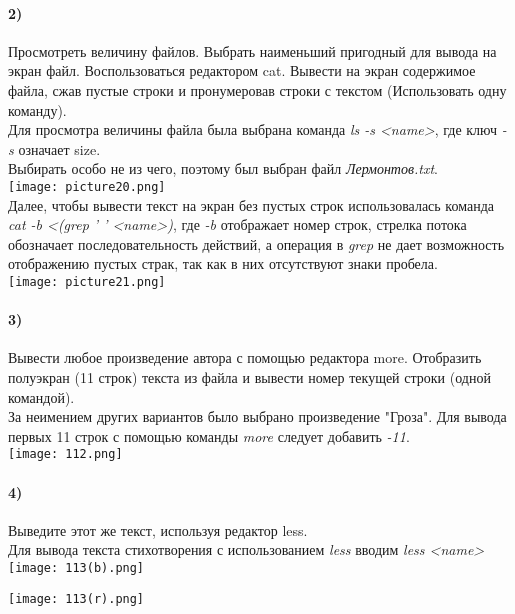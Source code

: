 		\paragraph{2)}
		Просмотреть величину файлов. Выбрать наименьший пригодный для вывода на экран файл. Воспользоваться редактором cat. Вывести на экран содержимое файла, сжав пустые строки и пронумеровав строки с текстом (Использовать одну команду). 
		\\
		Для просмотра величины файла была выбрана команда \textit{ls -s <name>}, 		где ключ \textit{-s} означает size. \\
	Выбирать особо не из чего, поэтому был выбран файл \textit{Лермонтов.txt}.\\
	\texttt{[image: picture20.png]} 
	\\
		Далее, чтобы вывести текст на экран без пустых строк использовалась команда 	\textit{cat -b <(grep ' ' <name>)}, где \textit{-b} отображает номер строк, 		стрелка потока обозначает последовательность действий, а операция в  				\textit{grep} не дает возможность отображению пустых страк, так как в них 			отсутствуют знаки пробела.\\
	\texttt{[image: picture21.png]} 
	\\
	
		\paragraph{3)}
		Вывести любое произведение автора с помощью редактора more. Отобразить полуэкран (11 строк) текста из файла и вывести номер текущей строки (одной командой). 
		\\
		За неимением других вариантов было выбрано произведение "Гроза". Для вывода 	первых 11 строк с помощью команды \textit{more} следует добавить \textit{-11}.
	\\
	\texttt{[image: 112.png]}
	\\
		\paragraph{4)}
		Выведите этот же текст, используя редактор less. 
		\\
		Для вывода текста стихотворения с использованием \textit{less} вводим 			\textit{less <name>}\\
	\texttt{[image: 113(b).png]}
	\\
	\begin{center}
		\texttt{[image: 113(r).png]}
	\end{center}
	
